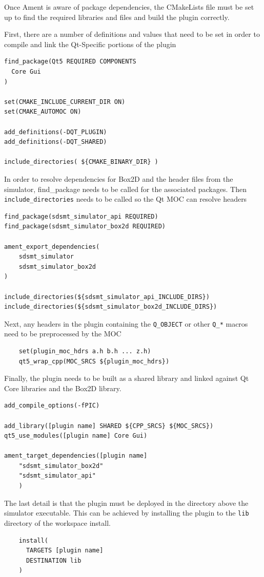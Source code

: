 \begin{itemize}
Once Ament is aware of package dependencies, the CMakeLists file must be set up to find the required libraries and files and build the plugin correctly.

First, there are a number of definitions and values that need to be set in order to compile and link the Qt-Specific portions of the plugin
\begin{lstlisting}
find_package(Qt5 REQUIRED COMPONENTS
  Core Gui
)

set(CMAKE_INCLUDE_CURRENT_DIR ON)
set(CMAKE_AUTOMOC ON)

add_definitions(-DQT_PLUGIN)
add_definitions(-DQT_SHARED)

include_directories( ${CMAKE_BINARY_DIR} )
\end{lstlisting}

In order to resolve dependencies for Box2D and the header files from the simulator, find\_package needs to be called for the associated packages. Then \lstinline|include_directories| needs to be called so the Qt MOC can resolve headers
\begin{lstlisting}
find_package(sdsmt_simulator_api REQUIRED)
find_package(sdsmt_simulator_box2d REQUIRED)
    
ament_export_dependencies(
    sdsmt_simulator
    sdsmt_simulator_box2d
)

include_directories(${sdsmt_simulator_api_INCLUDE_DIRS})
include_directories(${sdsmt_simulator_box2d_INCLUDE_DIRS})
\end{lstlisting}

Next, any headers in the plugin containing the \lstinline|Q_OBJECT| or other \lstinline|Q_*| macros need to be preprocessed by the MOC
\begin{lstlisting}
	set(plugin_moc_hdrs a.h b.h ... z.h)
    qt5_wrap_cpp(MOC_SRCS ${plugin_moc_hdrs})
\end{lstlisting}

Finally, the plugin needs to be built as a shared library and linked against Qt Core libraries and the Box2D library.
\begin{lstlisting}
add_compile_options(-fPIC)

add_library([plugin name] SHARED ${CPP_SRCS} ${MOC_SRCS})
qt5_use_modules([plugin name] Core Gui)

ament_target_dependencies([plugin name]
	"sdsmt_simulator_box2d"
	"sdsmt_simulator_api"
	)
\end{lstlisting}

The last detail is that the plugin must be deployed in the directory above the simulator executable. This can be achieved by installing the plugin to the \lstinline|lib| directory of the workspace install.
\begin{lstlisting}
    install(
      TARGETS [plugin name]
      DESTINATION lib
    )
\end{lstlisting}


\end{itemize}
